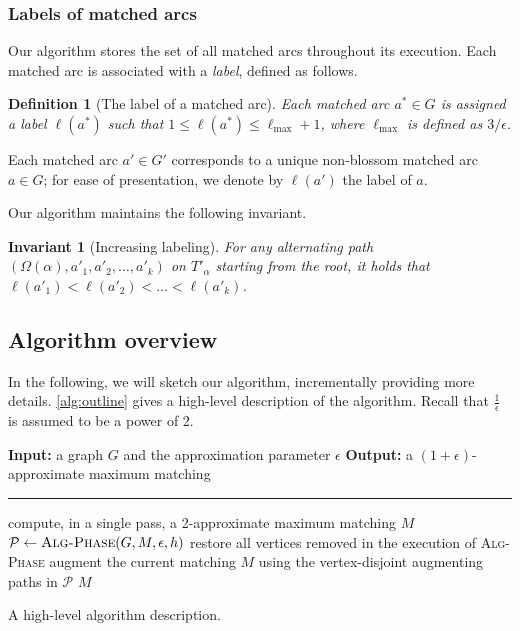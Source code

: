 \documentclass{article}
\newcommand{\alp}{\alpha}
\newcommand{\eps}{\epsilon}
\newcommand{\Omg}{\Omega}
\newcommand{\lmax}{\ell_{\max}}
\newcommand{\calP}{\mathcal{P}}
\newcommand{\algPhase}{\textsc{Alg-Phase}\xspace}
\newtheorem{definition}[theorem]{Definition}
\newtheorem{invariant}[theorem]{Invariant}
\begin{document}
\subsubsection{Labels of matched arcs} \label{sec:label}

Our algorithm stores the set of all matched arcs throughout its execution.
Each matched arc is associated with a \emph{label}, defined as follows.

\begin{definition}[The label of a matched arc]
Each matched arc $a^* \in G$ is assigned a label $\ell(a^*)$ such that $1 \leq \ell(a^*) \leq \lmax + 1$, where $\lmax$ is defined as $3 / \eps$.
\end{definition}

\noindent Each matched arc $a' \in G'$ corresponds to a unique non-blossom matched arc $a \in G$;
for ease of presentation, we denote by $\ell(a')$ the label of $a$.

Our algorithm maintains the following invariant.

\begin{invariant}[Increasing labeling] \label{inv:increasing-labeling} 
For any alternating path $(\Omg(\alp), a'_1, a'_2, \ldots, a'_k)$ on $T'_\alp$ starting from the root, it holds that $\ell(a'_1) < \ell(a'_2) < \dots < \ell(a'_k)$.
\end{invariant}



\subsection{Algorithm overview}
\label{sec:algo-statement}

In the following, we will sketch our algorithm, incrementally providing more details.
\cref{alg:outline} gives a high-level description of the algorithm. Recall that $\frac{1}{\eps}$ is assumed to be a power of $2$.

\begin{algorithm}
\begin{algorithmic}[1]
\medskip 
\Statex \textbf{Input:} a graph $G$ and the approximation parameter $\eps$
\Statex \textbf{Output:} a $(1+\eps)$-approximate maximum matching
\medskip
\Statex \hrule 

\State compute, in a single pass, a 2-approximate maximum matching $M$ \label{line:2-approx-matching}
    \For {phases $t = 1, 2, \dots, \frac{144}{h\eps}$ \label{line:call-phase-given-h}} 
        \State $\calP \gets \algPhase(G, M, \eps, h)$ 
        \State restore all vertices removed in the execution of \algPhase \label{line:restore}
        \State augment the current matching $M$ using the vertex-disjoint augmenting paths in $\calP$ \label{line:augment}
    \EndFor
\EndFor
\State \Return $M$
\end{algorithmic}
\caption{A high-level algorithm description.}
\label{alg:outline}
\end{algorithm}
\end{document}

